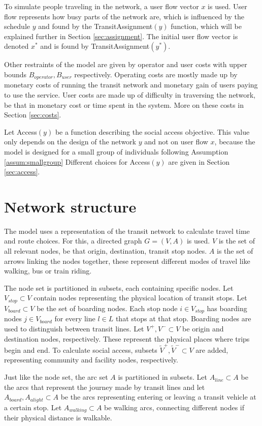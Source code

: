 To simulate people traveling in the network, a user flow vector $x$ is used. User flow represents how busy parts of the network are, which is influenced by the schedule $y$ and found by the TransitAssignment$(y)$ function, which will be explained further in Section \ref{sec:assignment}. The initial user flow vector is denoted $x^*$ and is found by TransitAssignment$(y^*)$.

Other restraints of the model are given by operator and user costs with upper bounds $B_{operator},\allowbreak B_{user}$ respectively. Operating costs are mostly made up by monetary costs of running the transit network and monetary gain of users paying to use the service. User costs are made up of difficulty in traversing the network, be that in monetary cost or time spent in the system. More on these costs in Section \ref{sec:costs}.

Let Access$(y)$ be a function describing the social access objective. This value only depends on the design of the network $y$ and not on user flow $x$, because the model is designed for a small group of individuals following Assumption \ref{assum:smallgroup} Different choices for Access$(y)$ are given in Section \ref{sec:access}.

\section{Network structure}
The model uses a representation of the transit network to calculate travel time and route choices. For this, a directed graph $G = (V,A)$ is used. $V$ is the set of all relevant nodes, be that origin, destination, transit stop nodes. $A$ is the set of arrows linking the nodes together, these represent different modes of travel like walking, bus or train riding.

The node set is partitioned in subsets, each containing specific nodes. Let $V_{stop}\subset V$ contain nodes representing the physical location of transit stops. Let $V_{board}\subset V$ be the set of boarding nodes. Each stop node $i\in V_{stop}$ has boarding nodes $j\in V_{board}$ for every line $l\in L$ that stops at that stop. Boarding nodes are used to distinguish between transit lines. Let $V^+, V^- \subset V$ be origin and destination nodes, respectively. These represent the physical places where trips begin and end. To calculate social access, subsets $\tilde V^+, \tilde V^-\subset V$ are added, representing community and facility nodes, respectively.

Just like the node set, the arc set $A$ is partitioned in subsets. Let $A_{line}\subset A$ be the arcs that represent the journey made by transit lines and let $A_{board},\allowbreak A_{alight}\subset A$  be the arcs representing entering or leaving a transit vehicle at a certain stop. Let $A_{walking}\subset A$ be walking arcs, connecting different nodes if their physical distance is walkable.

